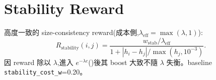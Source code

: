\section{Stability Reward}\label{sec:as-stab}
高度一致的 size-consistency reward(成本側,\(\lambda_{\mathrm{eff}}=\max(\lambda,1)\)):
\begin{equation}\label{eq:as-stab}
  R_{\mathrm{stability}}(i,j)=
  \frac{w_{\mathrm{stab}}/\lambda_{\mathrm{eff}}}
       {1+|h_i-h_j|/\max(h_j,10^{-3})}.
\end{equation}
因 reward 除以 \(\lambda\),進入 \(e^{-\lambda c}\)()後其 boost 大致不隨
\(\lambda\) 失衡。baseline \texttt{stability\_cost\_w}=0.20。

